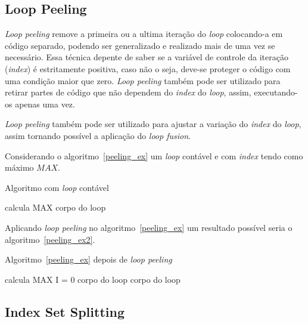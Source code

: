\subsection{Loop Peeling}

\textit{Loop peeling} remove a primeira ou a ultima iteração do \textit{loop} 
colocando-a em código separado, podendo ser generalizado e realizado mais 
de uma vez se necessário. 
Essa técnica depente de saber se a variável de controle da iteração
(\textit{index}) é estritamente positiva, caso não o seja, deve-se proteger 
o código com uma condição maior que zero.
\textit{Loop peeling} também pode ser utilizado para retirar partes de código 
que não dependem do \textit{index} do \textit{loop}, assim, executando-os apenas
uma vez.

\textit{Loop peeling} também pode ser utilizado para ajustar a variação do 
\textit{index} do \textit{loop}, assim tornando possível a aplicação 
do \textit{loop fusion}.

Considerando o algoritmo~\ref{peeling_ex} um \textit{loop} contável e 
com \textit{index} tendo como máximo $MAX$.

\begin{algorithm}
\caption{Algoritmo com \textit{loop} contável}
\label{peeling_ex}
\begin{algorithmic}[1]

\STATE calcula MAX
\STATE corpo do loop
\ENDFOR

\end{algorithmic}
\end{algorithm}

Aplicando \textit{loop peeling} no algoritmo~\ref{peeling_ex} um resultado
possível seria o algoritmo~\ref{peeling_ex2}.

\begin{algorithm}
\caption{Algoritmo~\ref{peeling_ex} depois de \textit{loop peeling}}
\label{peeling_ex2}
\begin{algorithmic}[1]

\STATE calcula MAX
\STATE I = 0
\STATE corpo do loop
\STATE corpo do loop
\ENDFOR
\ENDIF

\end{algorithmic}
\end{algorithm}


\subsection{Index Set Splitting}

